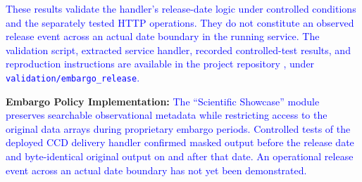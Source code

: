 \textcolor{blue}{These results validate the handler's release-date logic under controlled conditions and the separately tested HTTP operations. They do not constitute an observed release event across an actual date boundary in the running service. The validation script, extracted service handler, recorded controlled-test results, and reproduction instructions are available in the project repository \citep{fai_sort_repo}, under \texttt{validation/embargo\_release}.}

\item \textbf{Embargo Policy Implementation:} \textcolor{blue}{The ``Scientific Showcase'' module preserves searchable observational metadata while restricting access to the original data arrays during proprietary embargo periods. Controlled tests of the deployed CCD delivery handler confirmed masked output before the release date and byte-identical original output on and after that date. An operational release event across an actual date boundary has not yet been demonstrated.}

